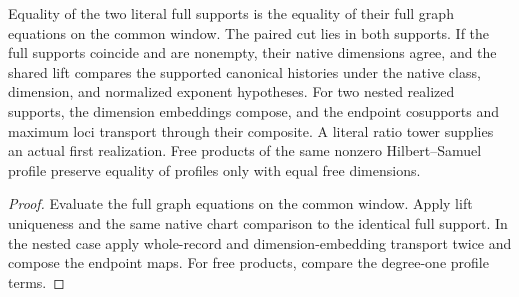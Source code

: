 \begin{theorem}
\label{hir:g1-literal-shared-support-and-padding}
\leanok
Equality of the two literal full supports is the equality of
their full graph equations on the common window. The paired
cut lies in both supports. If the full supports coincide and
are nonempty, their native dimensions agree, and the shared
lift compares the supported canonical histories under the
native class, dimension, and normalized exponent hypotheses.
For two nested realized supports, the dimension embeddings
compose, and the endpoint cosupports and maximum loci
transport through their composite. A literal ratio tower
supplies an actual first realization. Free products of the
same nonzero Hilbert--Samuel profile preserve equality of
profiles only with equal free dimensions.
\end{theorem}
\begin{proof}
Evaluate the full graph equations on the common window.
Apply lift uniqueness and the same native chart comparison
to the identical full support. In the nested case apply
whole-record and dimension-embedding transport twice and
compose the endpoint maps. For free products, compare the
degree-one profile terms.
\end{proof}

